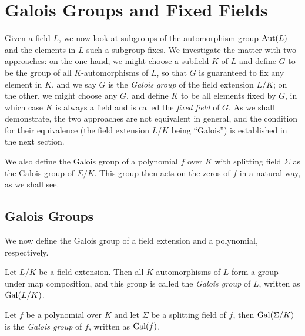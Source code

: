 \section{Galois Groups and Fixed Fields}
Given a field $L$, we now look at subgroups of the automorphism group $\operatorname{Aut}(L)$ and the elements in $L$ such a subgroup fixes. We investigate the matter with two approaches: on the one hand, we might choose a subfield $K$ of $L$ and define $G$ to be the group of all $K$-automorphisms of $L$, so that $G$ is guaranteed to fix any element in $K$, and we say $G$ is the \textit{Galois group} of the field extension $L/K$; on the other, we might choose any $G$, and define $K$ to be all elements fixed by $G$, in which case $K$ is always a field and is called the \textit{fixed field} of $G$. As we shall demonstrate, the two approaches are not equivalent in general, and the condition for their equivalence (the field extension $L/K$ being ``Galois'') is established in the next section. 

We also define the Galois group of a polynomial $f$ over $K$ with splitting field $\Sigma$ as the Galois group of $\Sigma / K$. This group then acts on the zeros of $f$ in a natural way, as we shall see. 

\subsection{Galois Groups}


We now define the Galois group of a field extension and a polynomial, respectively.
\begin{definition}
    Let $L/K$ be a field extension. Then all $K$-automorphisms of $L$ form a group under map composition, and this group is called the \textit{Galois group} of $L$, written as \(\operatorname{Gal}(L/K)\).
\end{definition}


\begin{definition}
	Let $f$ be a polynomial over $K$ and let $\Sigma$ be a splitting field of $f$, then $\operatorname{Gal}(\Sigma/K)$ is the \textit{Galois group} of $f$, written as \(\operatorname{Gal}(f)\).
	
\end{definition}

